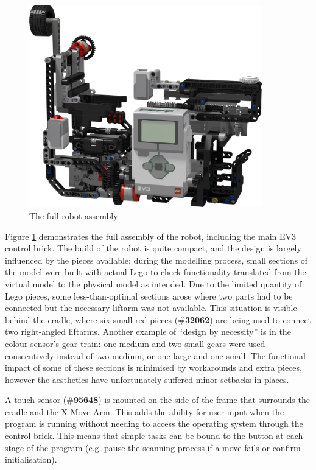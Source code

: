 \documentclass{report}
\newcommand{\tbo}[1]{\textbf{#1}}
\newcommand{\legopiece}[1]{(\#\tbo{#1})}
\begin{document}
	\begin{figure}[H]
		\begin{center}
			\includegraphics[width=0.9\textwidth]{Resources/Images/rdrFullRobotV1.png}
			\caption{The full robot assembly}
			\label{fig:rdrFullRobotV1}
		\end{center}
	\end{figure}

	Figure \ref{fig:rdrFullRobotV1} demonstrates the full assembly of the robot, including the main EV3 control brick. The build of the robot is quite compact, and the design is largely influenced by the pieces available: during the modelling process, small sections of the model were built with actual Lego to check functionality translated from the virtual model to the physical model as intended. Due to the limited quantity of Lego pieces, some less-than-optimal sections arose where two parts had to be connected but the necessary liftarm was not available. This situation is visible behind the cradle, where six small red pieces \legopiece{32062} are being used to connect two right-angled liftarms. Another example of \enquote{design by necessity} is in the colour sensor's gear train: one medium and two small gears were used consecutively instead of two medium, or one large and one small. The functional impact of some of these sections is minimised by workarounds and extra pieces, however the aesthetics have unfortunately suffered minor setbacks in places.

	A touch sensor \legopiece{95648} is mounted on the side of the frame that surrounds the cradle and the X-Move Arm. This adds the ability for user input when the program is running without needing to access the operating system through the control brick. This means that simple tasks can be bound to the button at each stage of the program (e.g. pause the scanning process if a move fails or confirm initialisation).
	
\end{document}
